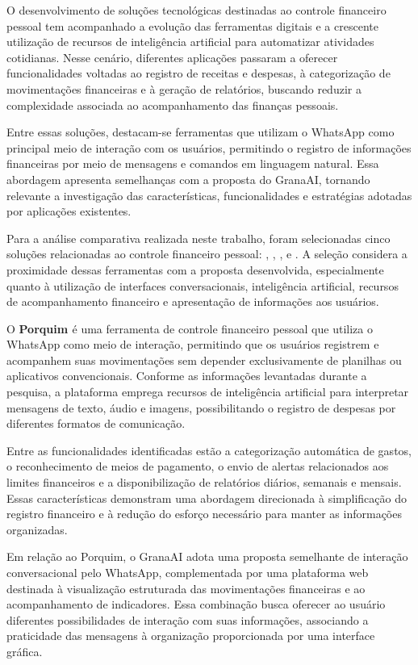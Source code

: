 O desenvolvimento de soluções tecnológicas destinadas ao controle financeiro pessoal tem acompanhado a evolução das ferramentas digitais e a crescente utilização de recursos de inteligência artificial para automatizar atividades cotidianas. Nesse cenário, diferentes aplicações passaram a oferecer funcionalidades voltadas ao registro de receitas e despesas, à categorização de movimentações financeiras e à geração de relatórios, buscando reduzir a complexidade associada ao acompanhamento das finanças pessoais.

Entre essas soluções, destacam-se ferramentas que utilizam o WhatsApp como principal meio de interação com os usuários, permitindo o registro de informações financeiras por meio de mensagens e comandos em linguagem natural. Essa abordagem apresenta semelhanças com a proposta do GranaAI, tornando relevante a investigação das características, funcionalidades e estratégias adotadas por aplicações existentes.

Para a análise comparativa realizada neste trabalho, foram selecionadas cinco soluções relacionadas ao controle financeiro pessoal: , , ,  e . A seleção considera a proximidade dessas ferramentas com a proposta desenvolvida, especialmente quanto à utilização de interfaces conversacionais, inteligência artificial, recursos de acompanhamento financeiro e apresentação de informações aos usuários.

O \textbf{Porquim \cite{porquim_2026}} é uma ferramenta de controle financeiro pessoal que utiliza o WhatsApp como meio de interação, permitindo que os usuários registrem e acompanhem suas movimentações sem depender exclusivamente de planilhas ou aplicativos convencionais. Conforme as informações levantadas durante a pesquisa, a plataforma emprega recursos de inteligência artificial para interpretar mensagens de texto, áudio e imagens, possibilitando o registro de despesas por diferentes formatos de comunicação.

Entre as funcionalidades identificadas estão a categorização automática de gastos, o reconhecimento de meios de pagamento, o envio de alertas relacionados aos limites financeiros e a disponibilização de relatórios diários, semanais e mensais. Essas características demonstram uma abordagem direcionada à simplificação do registro financeiro e à redução do esforço necessário para manter as informações organizadas.

Em relação ao Porquim, o GranaAI adota uma proposta semelhante de interação conversacional pelo WhatsApp, complementada por uma plataforma web destinada à visualização estruturada das movimentações financeiras e ao acompanhamento de indicadores. Essa combinação busca oferecer ao usuário diferentes possibilidades de interação com suas informações, associando a praticidade das mensagens à organização proporcionada por uma interface gráfica.


